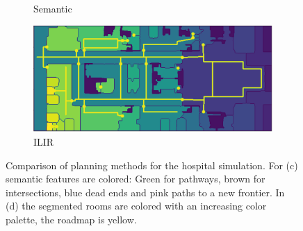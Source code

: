 \begin{figure}[h]
\begin{subfigure}{.5\textwidth}
      \caption{Semantic \cite{fredriksson_semantic_2023}}
    \end{subfigure}%
    \begin{subfigure}{.5\textwidth}
      \centering
      \includegraphics[width=\textwidth]{figures/60_results/aws_roadmap_horizontal.png}\vspace{5pt}
      \caption{ILIR}
    \end{subfigure}
    \caption[Comparison of planning methods for the hospital simulation]{Comparison of planning methods for the hospital simulation. For (c) semantic features are colored: Green for pathways, brown for intersections, blue dead ends and pink paths to a new frontier. In (d) the segmented rooms are colored with an increasing color palette, the roadmap is yellow.}
    \label{fig:aws_comparison}
\end{figure}

